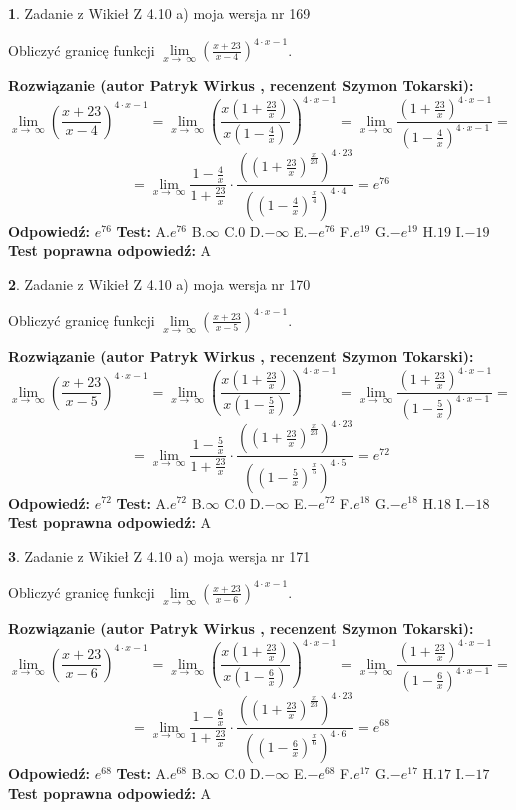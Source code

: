 \documentclass[12pt, a4paper]{article}
\theoremstyle{definition} %
\newtheorem{zad}{}
\newcommand{\zadStart}[1]{\begin{zad}#1\newline}
\newcommand{\zadStop}{\end{zad}}
\newcommand{\rozwStart}[2]{\noindent \textbf{Rozwiązanie (autor #1 , recenzent #2): }\newline}
\newcommand{\rozwStop}{\newline}
\newcommand{\odpStart}{\noindent \textbf{Odpowiedź:}\newline}
\newcommand{\odpStop}{\newline}
\newcommand{\testStart}{\noindent \textbf{Test:}\newline}
\newcommand{\testStop}{\newline}
\newcommand{\kluczStart}{\noindent \textbf{Test poprawna odpowiedź:}\newline}
\newcommand{\kluczStop}{\newline}
\begin{document}
\zadStart{Zadanie z Wikieł Z 4.10 a) moja wersja nr 169}

Obliczyć granicę funkcji  $\lim\limits_{x\to\ \infty}(\frac{x+23}{x-4})^{4\cdot x-1}$.
\zadStop
\rozwStart{Patryk Wirkus}{Szymon Tokarski}
$$\lim\limits_{x\to\ \infty}(\frac{x+23}{x-4})^{4\cdot x-1} = \lim\limits_{x\to\ \infty}(\frac{x(1+\frac{23}{x})}{x(1-\frac{4}{x})})^{4\cdot x-1}=\lim\limits_{x\to\ \infty}\frac{(1+\frac{23}{x})^{4\cdot x-1}}{(1-\frac{4}{x})^{4\cdot x-1}}=$$
$$=\lim\limits_{x\to\ \infty}\frac{1-\frac{4}{x}}{1+\frac{23}{x}}\cdot\frac{((1+\frac{23}{x})^{\frac{x}{23}})^{4\cdot23}}{((1-\frac{4}{x})^{\frac{x}{4}})^{4\cdot4}}=e^{76}$$
\rozwStop
\odpStart
$e^{76}$
\odpStop
\testStart
A.$e^{76}$ B.$\infty$ C.$0$ D.$-\infty$ E.$-e^{76}$
F.$e^{19}$ G.$-e^{19}$
H.$19$
I.$-19$
\testStop
\kluczStart
A
\kluczStop



\zadStart{Zadanie z Wikieł Z 4.10 a) moja wersja nr 170}

Obliczyć granicę funkcji  $\lim\limits_{x\to\ \infty}(\frac{x+23}{x-5})^{4\cdot x-1}$.
\zadStop
\rozwStart{Patryk Wirkus}{Szymon Tokarski}
$$\lim\limits_{x\to\ \infty}(\frac{x+23}{x-5})^{4\cdot x-1} = \lim\limits_{x\to\ \infty}(\frac{x(1+\frac{23}{x})}{x(1-\frac{5}{x})})^{4\cdot x-1}=\lim\limits_{x\to\ \infty}\frac{(1+\frac{23}{x})^{4\cdot x-1}}{(1-\frac{5}{x})^{4\cdot x-1}}=$$
$$=\lim\limits_{x\to\ \infty}\frac{1-\frac{5}{x}}{1+\frac{23}{x}}\cdot\frac{((1+\frac{23}{x})^{\frac{x}{23}})^{4\cdot23}}{((1-\frac{5}{x})^{\frac{x}{5}})^{4\cdot5}}=e^{72}$$
\rozwStop
\odpStart
$e^{72}$
\odpStop
\testStart
A.$e^{72}$ B.$\infty$ C.$0$ D.$-\infty$ E.$-e^{72}$
F.$e^{18}$ G.$-e^{18}$
H.$18$
I.$-18$
\testStop
\kluczStart
A
\kluczStop



\zadStart{Zadanie z Wikieł Z 4.10 a) moja wersja nr 171}

Obliczyć granicę funkcji  $\lim\limits_{x\to\ \infty}(\frac{x+23}{x-6})^{4\cdot x-1}$.
\zadStop
\rozwStart{Patryk Wirkus}{Szymon Tokarski}
$$\lim\limits_{x\to\ \infty}(\frac{x+23}{x-6})^{4\cdot x-1} = \lim\limits_{x\to\ \infty}(\frac{x(1+\frac{23}{x})}{x(1-\frac{6}{x})})^{4\cdot x-1}=\lim\limits_{x\to\ \infty}\frac{(1+\frac{23}{x})^{4\cdot x-1}}{(1-\frac{6}{x})^{4\cdot x-1}}=$$
$$=\lim\limits_{x\to\ \infty}\frac{1-\frac{6}{x}}{1+\frac{23}{x}}\cdot\frac{((1+\frac{23}{x})^{\frac{x}{23}})^{4\cdot23}}{((1-\frac{6}{x})^{\frac{x}{6}})^{4\cdot6}}=e^{68}$$
\rozwStop
\odpStart
$e^{68}$
\odpStop
\testStart
A.$e^{68}$ B.$\infty$ C.$0$ D.$-\infty$ E.$-e^{68}$
F.$e^{17}$ G.$-e^{17}$
H.$17$
I.$-17$
\testStop
\kluczStart
A
\kluczStop
\end{document}
